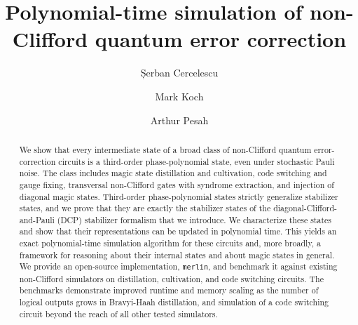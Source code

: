 \documentclass[aps,prx,twocolumn,10pt,notitlepage,longbibliography,superscriptaddress]{revtex4-2}
\theoremstyle{definition}
\theoremstyle{remark}
\numberwithin{equation}{section}
\begin{document}
\title{Polynomial-time simulation of non-Clifford quantum error correction}
\author{Șerban Cercelescu}
\author{Mark Koch}
\author{Arthur Pesah}

\begin{abstract}
We show that every intermediate state of a broad class of non-Clifford quantum error-correction circuits is a third-order phase-polynomial state, even under stochastic Pauli noise. The class includes magic state distillation and cultivation, code switching and gauge fixing, transversal non-Clifford gates with syndrome extraction, and injection of diagonal magic states. Third-order phase-polynomial states strictly generalize stabilizer states, and we prove that they are exactly the stabilizer states of the diagonal-Clifford-and-Pauli (DCP) stabilizer formalism that we introduce. We characterize these states and show that their representations can be updated in polynomial time. This yields an exact polynomial-time simulation algorithm for these circuits and, more broadly, a framework for reasoning about their internal states and about magic states in general. We provide an open-source implementation, \texttt{merlin}, and benchmark it against existing non-Clifford simulators on distillation, cultivation, and code switching circuits. The benchmarks demonstrate improved runtime and memory scaling as the number of logical outputs grows in Bravyi-Haah distillation, and simulation of a code switching circuit beyond the reach of all other tested simulators.
\end{abstract}
\maketitle

\begingroup
\makeatletter
\let\l@subsection\@gobbletwo
\let\l@subsubsection\@gobbletwo
\makeatother
\tableofcontents
\endgroup











\end{document}
